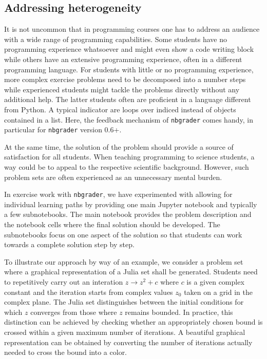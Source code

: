 \documentclass[twocolumn]{svjour3}          %
\begin{document}
\subsection{Addressing heterogeneity}

It is not uncommon that in programming courses one has to address an audience
with a wide range of programming capabilities. Some students have no
programming experience whatsoever and might even show a code writing block
while others have an extensive programming experience, often in a different
programming language. For students with little or no programming experience,
more complex exercise problems need to be decomposed into a number steps while
experienced students might tackle the problems directly without any additional
help. The latter students often are proficient in a language different from
Python. A typical indicator are loops over indiced instead of objects contained
in a list. Here, the feedback mechanism of \texttt{nbgrader} comes handy, in
particular for \texttt{nbgrader} version 0.6+.

At the same time, the solution of the problem should provide a source of
satisfaction for all students. When teaching programming to science students, a
way could be to appeal to the respective scientific background. However, such
problem sets are often experienced as an unnecessary mental burden.

In exercise work with \texttt{nbgrader}, we have experimented with allowing for
individual learning paths by providing one main Jupyter notebook and typically
a few subnotebooks. The main notebook provides the problem description and the
notebook cells where the final solution should be developed. The subnotebooks
focus on one aspect of the solution so that students can work towards a complete
solution step by step.

To illustrate our approach by way of an example, we consider a problem set
where a graphical representation of a Julia set shall be generated. Students
need to repetitively carry out an interation $z\rightarrow z^2+c$ where $c$ is
a given complex constant and the iteration starts from complex values $z_0$
taken on a grid in the complex plane. The Julia set distinguishes between the
initial conditions for which $z$ converges from those where $z$ remains bounded.
In practice, this distinction can be achieved by checking whether an appropriately
chosen bound is crossed within a given maximum number of iterations. A beautiful
graphical representation can be obtained by converting the number of iterations
actually needed to cross the bound into a color. 
\end{document}
